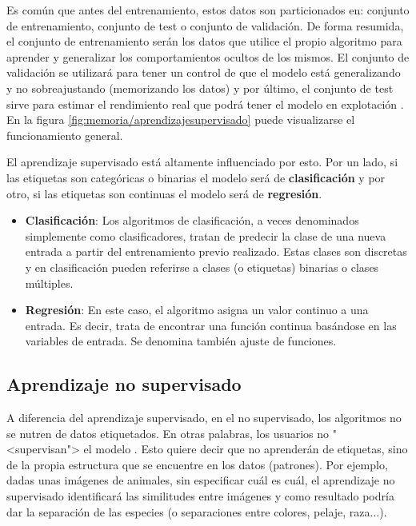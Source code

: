 Es común que antes del entrenamiento, estos datos son particionados en: conjunto de
entrenamiento, conjunto de test o conjunto de validación. De forma resumida, el
conjunto de entrenamiento serán los datos que utilice el propio algoritmo para
aprender y generalizar los comportamientos ocultos de los mismos. El conjunto de
validación se utilizará para tener un control de que el modelo está
generalizando y no sobreajustando (memorizando los datos) y por último, el
conjunto de test sirve para estimar el rendimiento real que podrá tener el
modelo en explotación \cite{enwiki:conjuntos}. En la figura
\ref{fig:memoria/aprendizajesupervisado} puede visualizarse el funcionamiento general.


El aprendizaje supervisado está altamente influenciado por esto. Por un lado, si
las etiquetas son categóricas o binarias el modelo será de
\textbf{clasificación} y por otro, si las etiquetas son continuas el modelo será
de \textbf{regresión}.

\begin{itemize}
    \item \textbf{Clasificación}: Los algoritmos de clasificación, a veces
    denominados simplemente como clasificadores, tratan de predecir la clase de
    una nueva entrada a partir del entrenamiento previo realizado. Estas clases
    son discretas y en clasificación pueden referirse a clases (o etiquetas)
    binarias o clases múltiples.
    
    \item \textbf{Regresión}: En este caso, el algoritmo asigna un valor
    continuo a una entrada. Es decir, trata de encontrar una función continua
    basándose en las variables de entrada. Se denomina también ajuste de
    funciones.
\end{itemize}

\clearpage

\subsection{Aprendizaje no supervisado}

A diferencia del aprendizaje supervisado, en el no supervisado, los algoritmos
no se nutren de datos etiquetados. En otras palabras, los usuarios no "<supervisan"> el modelo
\cite{salim:usl}. Esto quiere decir que no aprenderán de etiquetas, sino de la
propia estructura que se encuentre en los datos (patrones). Por ejemplo, dadas
unas imágenes de animales, sin especificar cuál es cuál, el aprendizaje no
supervisado identificará las similitudes entre imágenes y como resultado podría
dar la separación de las especies (o separaciones entre colores, pelaje,
raza...).

